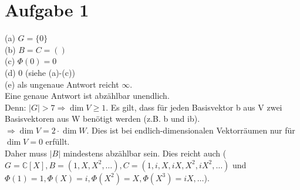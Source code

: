 \documentclass{scrartcl}
\begin{document}
\section*{Aufgabe 1}
(a) $G=\{0\}$\\
(b) $B=C=()$\\
(c) $\Phi(0)=0$\\
(d) 0 (siehe (a)-(c))\\
(e) als ungenaue Antwort reicht $\infty$.\\
Eine genaue Antwort ist abz\"ahlbar unendlich.\\
Denn: $|G|>7 \Rightarrow \dim V \geq 1$. Es gilt, dass f\"ur jeden Basisvektor b aus V zwei Basisvektoren aus W ben\"otigt werden (z.B. b und ib).\\
$\Rightarrow \dim V = 2\cdot\dim W$. Dies ist bei endlich-dimensionalen Vektorr\"aumen nur f\"ur $\dim V = 0$ erf\"ullt.\\
Daher muss $|B|$ mindestens abz\"ahlbar sein. Dies reicht auch ($G=\mathbb{C}[X],B=(1,X,X^2,\dots),C=(1,i,X,iX,X^2,iX^2,\dots)$ und $\Phi(1)=1,\Phi(X)=i,\Phi(X^2)=X,\Phi(X^3)=iX,\dots$).
\end{document}
